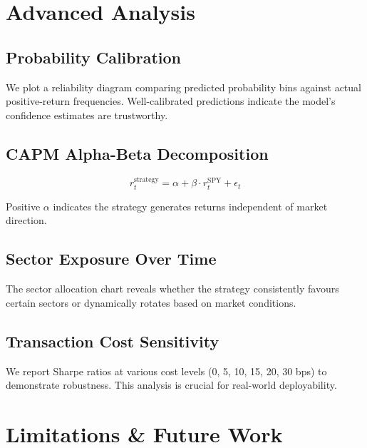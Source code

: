 \documentclass[12pt,a4paper]{article}
\begin{document}
\section{Advanced Analysis}

\subsection{Probability Calibration}
We plot a reliability diagram comparing predicted probability bins against actual positive-return frequencies. Well-calibrated predictions indicate the model's confidence estimates are trustworthy.

\subsection{CAPM Alpha-Beta Decomposition}
\begin{equation}
    r_t^{\text{strategy}} = \alpha + \beta \cdot r_t^{\text{SPY}} + \epsilon_t
\end{equation}

Positive $\alpha$ indicates the strategy generates returns independent of market direction.

\subsection{Sector Exposure Over Time}
The sector allocation chart reveals whether the strategy consistently favours certain sectors or dynamically rotates based on market conditions.

\subsection{Transaction Cost Sensitivity}
We report Sharpe ratios at various cost levels (0, 5, 10, 15, 20, 30 bps) to demonstrate robustness. This analysis is crucial for real-world deployability.

\section{Limitations \& Future Work}
\end{document}
